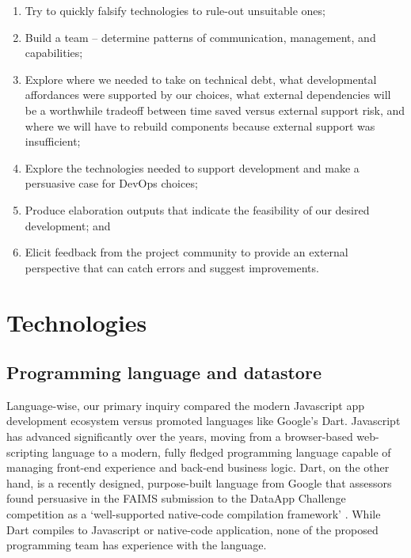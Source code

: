 \documentclass[a4paper,headings=small fontsize=10pt]{scrreprt}
\begin{document}
\begin{enumerate}
\item Try to quickly falsify technologies to rule-out unsuitable ones;
\item Build a team -- determine patterns of communication, management, and
  capabilities;
 
\item Explore where we needed to take on technical debt, what developmental
  affordances were supported by our choices, what external dependencies
  will be a worthwhile tradeoff between time saved versus external
  support risk, and where we will have to rebuild components because
  external support was insufficient;
 
\item Explore the technologies needed to support development and make a
  persuasive case for DevOps choices;
 
\item Produce elaboration outputs that indicate the feasibility of our
  desired development; and
 
\item Elicit feedback from the project community to provide an external
  perspective that can catch errors and suggest improvements.
 
\end{enumerate}

\chapter{Technologies}

\section{Programming language and
datastore}

Language-wise, our primary inquiry compared the modern Javascript app
development ecosystem versus promoted languages like Google's Dart.
Javascript has advanced significantly over the years, moving from a
browser-based web-scripting language to a modern, fully fledged
programming language capable of managing front-end experience and
back-end business logic. Dart, on the other hand, is a recently
designed, purpose-built language from Google that assessors found
persuasive in the FAIMS submission to the DataApp Challenge competition
as a `well-supported native-code compilation framework'
\autocite{Bureau_of_Reclamation2017-xl}. While Dart compiles to Javascript or native-code application,
none of the proposed programming team has experience with the language.
\end{document}
